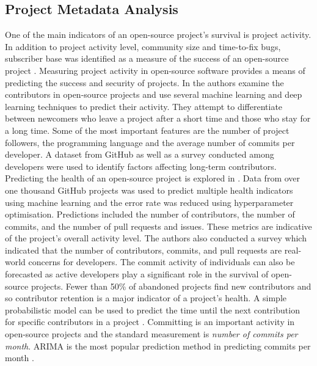 \documentclass[conference]{IEEEtran}
\begin{document}
\subsection{Project Metadata Analysis}
One of the main indicators of an open-source project's survival is project activity. In addition to project activity level, community size and time-to-fix bugs, subscriber base was identified as a measure of the success of an open-source project \cite{sen_open_2012}. Measuring project activity in open-source software provides a means of predicting the success and security of projects. In \cite{l_bao_large_2021} the authors examine the contributors in open-source projects and use several machine learning and deep learning techniques to predict their activity. They attempt to differentiate between newcomers who leave a project after a short time and those who stay for a long time. Some of the most important features are the number of project followers, the programming language and the average number of commits per developer. A dataset from GitHub as well as a survey conducted among developers were used to identify factors affecting long-term contributors. Predicting the health of an open-source project is explored in \cite{xia_predicting_2022}. Data from over one thousand GitHub projects was used to predict multiple health indicators using machine learning and the error rate was reduced using hyperparameter optimisation. Predictions included the number of contributors, the number of commits, and the number of pull requests and issues. These metrics are indicative of the project’s overall activity level. The authors also conducted a survey which indicated that the number of contributors, commits, and pull requests are real-world concerns for developers. The commit activity of individuals can also be forecasted as active developers play a significant role in the survival of open-source projects. Fewer than 50\% of abandoned projects find new contributors and so contributor retention is a major indicator of a project's health. A simple probabilistic model can be used to predict the time until the next contribution for specific contributors in a project \cite{decan_gap_2020}. Committing is an important activity in open-source projects and the standard measurement is \textit{number of commits per month}. ARIMA is the most popular prediction method in predicting commits per month \cite{chahal_fuzzy_2016}.
\end{document}
